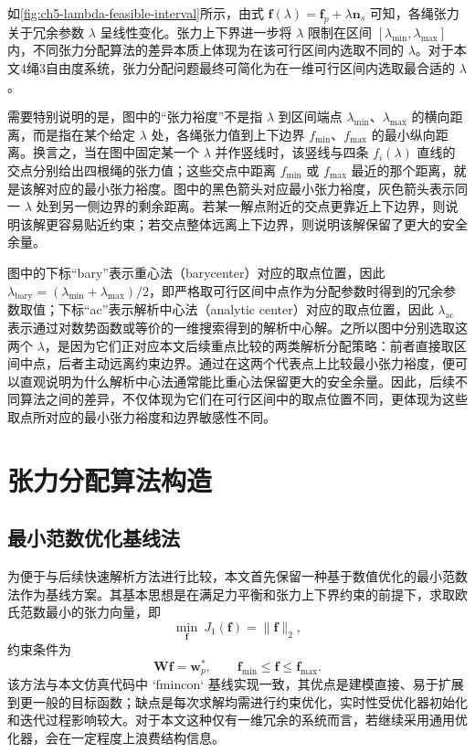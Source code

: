 如\cref{fig:ch5-lambda-feasible-interval}所示，由式 $\bm f(\lambda)=\bm f_p+\lambda\bm n_s$ 可知，各绳张力关于冗余参数 $\lambda$ 呈线性变化。张力上下界进一步将 $\lambda$ 限制在区间 $[\lambda_{\min},\lambda_{\max}]$ 内，不同张力分配算法的差异本质上体现为在该可行区间内选取不同的 $\lambda$。对于本文4绳3自由度系统，张力分配问题最终可简化为在一维可行区间内选取最合适的 $\lambda$。

需要特别说明的是，图中的“张力裕度”不是指 $\lambda$ 到区间端点 $\lambda_{\min}$、$\lambda_{\max}$ 的横向距离，而是指在某个给定 $\lambda$ 处，各绳张力值到上下边界 $f_{\min}$、$f_{\max}$ 的最小纵向距离。换言之，当在图中固定某一个 $\lambda$ 并作竖线时，该竖线与四条 $f_i(\lambda)$ 直线的交点分别给出四根绳的张力值；这些交点中距离 $f_{\min}$ 或 $f_{\max}$ 最近的那个距离，就是该解对应的最小张力裕度。图中的黑色箭头对应最小张力裕度，灰色箭头表示同一 $\lambda$ 处到另一侧边界的剩余距离。若某一解点附近的交点更靠近上下边界，则说明该解更容易贴近约束；若交点整体远离上下边界，则说明该解保留了更大的安全余量。

图中的下标“bary”表示重心法（barycenter）对应的取点位置，因此 $\lambda_{\mathrm{bary}}=(\lambda_{\min}+\lambda_{\max})/2$，即严格取可行区间中点作为分配参数时得到的冗余参数取值；下标“ac”表示解析中心法（analytic center）对应的取点位置，因此 $\lambda_{\mathrm{ac}}$ 表示通过对数势函数或等价的一维搜索得到的解析中心解。之所以图中分别选取这两个 $\lambda$，是因为它们正对应本文后续重点比较的两类解析分配策略：前者直接取区间中点，后者主动远离约束边界。通过在这两个代表点上比较最小张力裕度，便可以直观说明为什么解析中心法通常能比重心法保留更大的安全余量。因此，后续不同算法之间的差异，不仅体现为它们在可行区间中的取点位置不同，更体现为这些取点所对应的最小张力裕度和边界敏感性不同。

\section{张力分配算法构造}

\subsection{最小范数优化基线法}

为便于与后续快速解析方法进行比较，本文首先保留一种基于数值优化的最小范数法作为基线方案。其基本思想是在满足力平衡和张力上下界约束的前提下，求取欧氏范数最小的张力向量，即
\begin{equation}
  \min_{\bm f}\ J_1(\bm f)=\|\bm f\|_2, \label{eq:ch5-minnorm-obj}
\end{equation}
约束条件为
\begin{equation}
  \bm W\bm f=\bm w_p^\ast, \qquad\bm f_{\min}\le \bm f\le \bm f_{\max}.\label{eq:ch5-minnorm-eq}
\end{equation}
该方法与本文仿真代码中 `fmincon` 基线实现一致，其优点是建模直接、易于扩展到更一般的目标函数；缺点是每次求解均需进行约束优化，实时性受优化器初始化和迭代过程影响较大。对于本文这种仅有一维冗余的系统而言，若继续采用通用优化器，会在一定程度上浪费结构信息。

